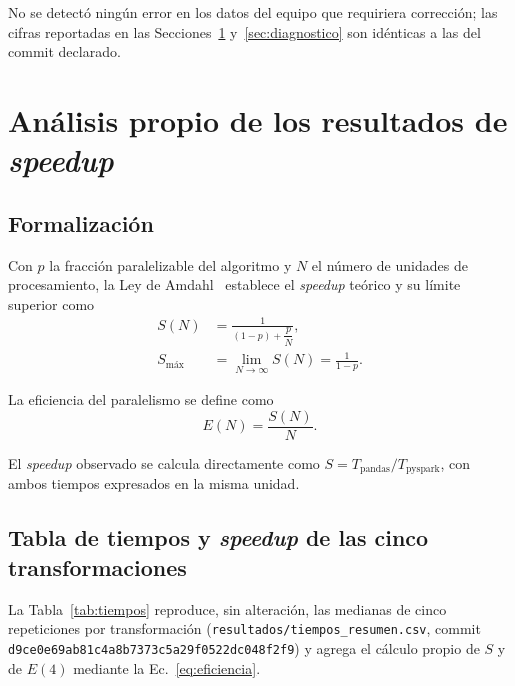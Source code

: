 \documentclass[11pt,a4paper]{article}
\newcommand{\committeam}{\texttt{d9ce0e69ab81c4a8b7373c5a29f0522dc048f2f9}}
\begin{document}
No se detect\'o ning\'un error en los datos del equipo que requiriera correcci\'on; las
cifras reportadas en las Secciones~\ref{sec:analisis} y~\ref{sec:diagnostico} son id\'enticas
a las del commit declarado.

\section{An\'alisis propio de los resultados de \textit{speedup}}
\label{sec:analisis}

\subsection{Formalizaci\'on}

Con $p$ la fracci\'on paralelizable del algoritmo y $N$ el n\'umero de unidades de
procesamiento, la Ley de Amdahl~\cite{amdahl1967} establece el \textit{speedup} te\'orico y su l\'imite
superior como
\begin{equation}
\begin{aligned}
S(N) &= \frac{1}{(1-p)+\dfrac{p}{N}}, \\[4pt]
S_{\text{m\'ax}} &= \lim_{N\to\infty} S(N) = \frac{1}{1-p}.
\end{aligned}
\label{eq:amdahl}
\end{equation}

La eficiencia del paralelismo se define como
\begin{equation}
E(N) = \frac{S(N)}{N}.
\label{eq:eficiencia}
\end{equation}

El \textit{speedup} observado se calcula directamente como $S = T_{\text{pandas}} /
T_{\text{pyspark}}$, con ambos tiempos expresados en la misma unidad.

\subsection{Tabla de tiempos y \textit{speedup} de las cinco transformaciones}

La Tabla~\ref{tab:tiempos} reproduce, sin alteraci\'on, las medianas de cinco repeticiones
por transformaci\'on (\texttt{resultados/\allowbreak{}tiempos\_resumen.\allowbreak{}csv}, commit \committeam) y agrega
el c\'alculo propio de $S$ y de $E(4)$ mediante la Ec.~\eqref{eq:eficiencia}.
\end{document}
